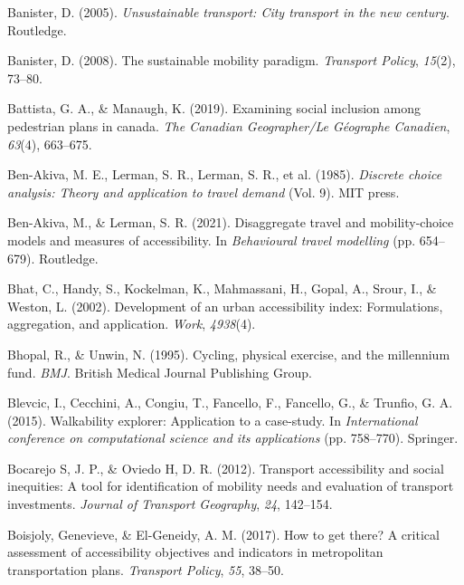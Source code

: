 \documentclass[
11pt, %
oneside, %
english, %
singlespacing, %
]{macthesis} %
\newlength{\cslhangindent}
\newenvironment{CSLReferences}[2] %
{\begin{list}{}{%
	\setlength{\itemindent}{0pt}
	\setlength{\leftmargin}{0pt}
	\setlength{\parsep}{0pt}
	\ifodd #1
	\setlength{\leftmargin}{\cslhangindent}
	\setlength{\itemindent}{-1\cslhangindent}
	\fi
	\setlength{\itemsep}{#2\baselineskip}}}
{\end{list}}
\begin{document}
\begin{CSLReferences}{1}{0}
Banister, D. (2005). \emph{Unsustainable transport: City transport in the new century}. Routledge.

Banister, D. (2008). The sustainable mobility paradigm. \emph{Transport Policy}, \emph{15}(2), 73--80.

Battista, G. A., \& Manaugh, K. (2019). Examining social inclusion among pedestrian plans in canada. \emph{The Canadian Geographer/Le G{é}ographe Canadien}, \emph{63}(4), 663--675.

Ben-Akiva, M. E., Lerman, S. R., Lerman, S. R., et al. (1985). \emph{Discrete choice analysis: Theory and application to travel demand} (Vol. 9). MIT press.

Ben-Akiva, M., \& Lerman, S. R. (2021). Disaggregate travel and mobility-choice models and measures of accessibility. In \emph{Behavioural travel modelling} (pp. 654--679). Routledge.

Bhat, C., Handy, S., Kockelman, K., Mahmassani, H., Gopal, A., Srour, I., \& Weston, L. (2002). Development of an urban accessibility index: Formulations, aggregation, and application. \emph{Work}, \emph{4938}(4).

Bhopal, R., \& Unwin, N. (1995). Cycling, physical exercise, and the millennium fund. \emph{BMJ}. British Medical Journal Publishing Group.

Blevcic, I., Cecchini, A., Congiu, T., Fancello, F., Fancello, G., \& Trunfio, G. A. (2015). Walkability explorer: Application to a case-study. In \emph{International conference on computational science and its applications} (pp. 758--770). Springer.

Bocarejo S, J. P., \& Oviedo H, D. R. (2012). Transport accessibility and social inequities: A tool for identification of mobility needs and evaluation of transport investments. \emph{Journal of Transport Geography}, \emph{24}, 142--154.

Boisjoly, Genevieve, \& El-Geneidy, A. M. (2017). How to get there? A critical assessment of accessibility objectives and indicators in metropolitan transportation plans. \emph{Transport Policy}, \emph{55}, 38--50.


\end{CSLReferences}
\end{document}
